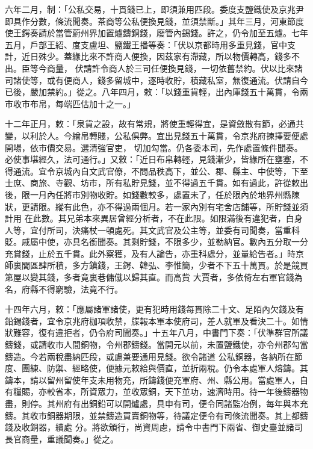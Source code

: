 \begin{pinyinscope}
 六年二月，制：「公私交易，十貫錢已上，即須兼用匹段。委度支鹽鐵使及京兆尹即具作分數，條流聞奏。茶商等公私便換見錢，並須禁斷。」其年三月，河東節度使王鍔奏請於當管蔚州界加置爐鑄銅錢，廢管內錫錢。許之，仍令加至五爐。七年五月，戶部王紹、度支盧坦、鹽鐵王播等奏：「伏以京都時用多重見錢，官中支計，近日殊少。蓋緣比來不許商人便換，因茲家有滯藏，所以物價轉高，錢多不出。臣等今商量，
 伏請許令商人於三司任便換見錢，一切依舊禁約。伏以比來諸司諸使等，或有便商人，錢多留城中，逐時收貯，積藏私室，無復通流。伏請自今已後，嚴加禁約。」從之。八年四月，敕：「以錢重貨輕，出內庫錢五十萬貫，令兩市收市布帛，每端匹估加十之一。」



 十二年正月，敕：「泉貨之設，故有常規，將使重輕得宜，是資斂散有節，必通共變，以利於人。今繒帛轉賤，公私俱弊。宜出見錢五十萬貫，令京兆府揀擇要便處開場，依市價交易。選清強官吏，
 切加勾當。仍各委本司，先作處置條件聞奏。必使事堪經久，法可通行。」又敕：「近日布帛轉輕，見錢漸少，皆緣所在壅塞，不得通流。宜令京城內自文武官僚，不問品秩高下，並公、郡、縣主、中使等，下至士庶、商旅、寺觀、坊市，所有私貯見錢，並不得過五千貫。如有過此，許從敕出後，限一月內任將市別物收貯。如錢數較多，處置未了，任於限內於地界州縣陳狀，更請限。縱有此色，亦不得過兩個月。若一家內別有宅舍店鋪等，所貯錢並須計用
 在此數。其兄弟本來異居曾經分析者，不在此限。如限滿後有違犯者，白身人等，宜付所司，決痛杖一頓處死。其文武官及公主等，並委有司聞奏，當重科貶。戚屬中使，亦具名銜聞奏。其剩貯錢，不限多少，並勒納官。數內五分取一分充賞錢，止於五千貫。此外察獲，及有人論告，亦重科處分，並量給告者。」時京師裏閭區肆所積，多方鎮錢，王鍔、韓弘、李惟簡，少者不下五十萬貫。於是競買第屋以變其錢，多者竟裏巷傭僦以歸其直。而高貲
 大賈者，多依倚左右軍官錢為名，府縣不得窮驗，法竟不行。



 十四年六月，敕：「應屬諸軍諸使，更有犯時用錢每貫除二十文、足陌內欠錢及有鉛錫錢者，宜令京兆府枷項收禁，牒報本軍本使府司，差人就軍及看決二十。如情狀難容，復有違拒者，仍令府司聞奏。」十五年八月，中書門下奏：「伏準群官所議鑄錢，或請收市人間銅物，令州郡鑄錢。當開元以前，未置鹽鐵使，亦令州郡勾當鑄造。今若兩稅盡納匹段，或慮兼要通用見錢。欲令諸道
 公私銅器，各納所在節度、團練、防禦、經略使，便據元敕給與價直，並折兩稅。仍令本處軍人熔鑄。其鑄本，請以留州留使年支未用物充，所鑄錢便充軍府、州、縣公用。當處軍人，自有糧賜，亦較省本，所資眾力，並收眾銅，天下並功，速濟時用。待一年後鑄器物盡，則停。其州府有出銅鉛可以開爐處，具申有司，便令同諸監冶例，每年與本充鑄。其收市銅器期限，並禁鑄造買賣銅物等，待議定便令有司條流聞奏。其上都鑄錢及收銅器，續處
 分。將欲頒行，尚資周慮，請令中書門下兩省、御史臺並諸司長官商量，重議聞奏。」從之。




\end{pinyinscope}

